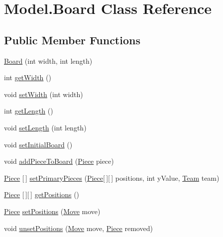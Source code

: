 \hypertarget{class_model_1_1_board}{}\section{Model.\+Board Class Reference}
\label{class_model_1_1_board}
\subsection*{Public Member Functions}
\begin{DoxyCompactItemize}
\item 
\hyperlink{class_model_1_1_board_a9deb765ab1477d72b1674de48a9a6584}{Board} (int width, int length)
\item 
int \hyperlink{class_model_1_1_board_ab6dc3bc9760045e82fa57053f816649f}{get\+Width} ()
\item 
void \hyperlink{class_model_1_1_board_a57a6550786751e1b80fee7552a9355b6}{set\+Width} (int width)
\item 
int \hyperlink{class_model_1_1_board_a35e5cb89e9ade67a786764d0466adecf}{get\+Length} ()
\item 
void \hyperlink{class_model_1_1_board_a189aa2f23e52d961f2cb7f39f584e0a6}{set\+Length} (int length)
\item 
void \hyperlink{class_model_1_1_board_aae76066ac44573318ad06038bcd1cf8e}{set\+Initial\+Board} ()
\item 
void \hyperlink{class_model_1_1_board_aabff4443881dcd377b3a51b06ef5a757}{add\+Piece\+To\+Board} (\hyperlink{class_model_1_1_pieces_1_1_piece}{Piece} piece)
\item 
\hyperlink{class_model_1_1_pieces_1_1_piece}{Piece} \mbox{[}$\,$\mbox{]} \hyperlink{class_model_1_1_board_a2a1d724b1cfaa4ec61b22e6d6b769cab}{set\+Primary\+Pieces} (\hyperlink{class_model_1_1_pieces_1_1_piece}{Piece}\mbox{[}$\,$\mbox{]}\mbox{[}$\,$\mbox{]} positions, int y\+Value, \hyperlink{class_model_1_1_team}{Team} team)
\item 
\hyperlink{class_model_1_1_pieces_1_1_piece}{Piece} \mbox{[}$\,$\mbox{]}\mbox{[}$\,$\mbox{]} \hyperlink{class_model_1_1_board_a6d51fda7af5f561f6bd1478e2411d3bd}{get\+Positions} ()
\item 
\hyperlink{class_model_1_1_pieces_1_1_piece}{Piece} \hyperlink{class_model_1_1_board_aec81a53097f16fadf2d64dab72cf6d47}{set\+Positions} (\hyperlink{class_model_1_1_move}{Move} move)
\item 
void \hyperlink{class_model_1_1_board_a6c918896308d9752d1e81989766c6bee}{unset\+Positions} (\hyperlink{class_model_1_1_move}{Move} move, \hyperlink{class_model_1_1_pieces_1_1_piece}{Piece} removed)

\end{DoxyCompactItemize}
